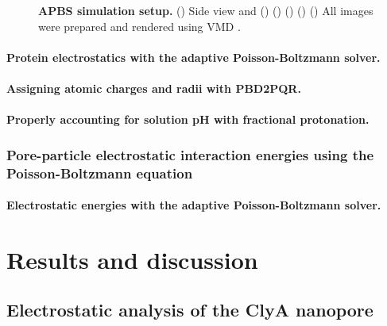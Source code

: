 \begin{figure*}[t]
\caption[APBS simulation setup.]{%
  \textbf{APBS simulation setup.}
  ()
  Side view and 
  ()
  ()
  ()
  ()
  ()
  All images were prepared and rendered using VMD \cite{Humphrey-1996,Stone-1998}.
  }\label{fig:apbs_focussing}
\end{figure*}


\paragraph{Protein electrostatics with the adaptive Poisson-Boltzmann solver.}

\paragraph{Assigning atomic charges and radii with PBD2PQR.}

\paragraph{Properly accounting for solution pH with fractional protonation.}


\subsubsection{Pore-particle electrostatic interaction energies using the Poisson-Boltzmann equation}
%

\paragraph{Electrostatic energies with the adaptive Poisson-Boltzmann solver.}


\section{Results and discussion}

\subsection{Electrostatic analysis of the ClyA nanopore}
%

